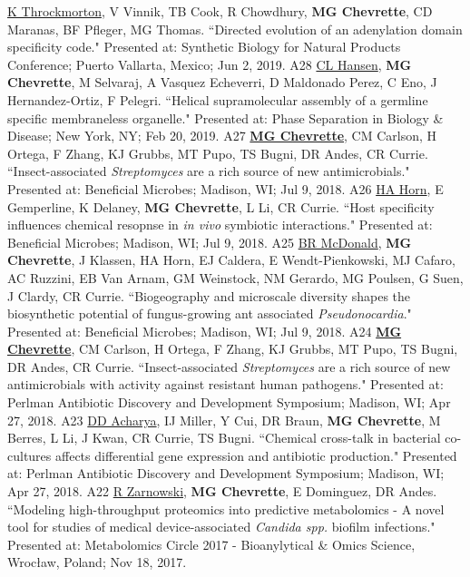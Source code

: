 \begin{cvpubs}
  \cvpub
    {\underline{K Throckmorton}, V Vinnik, TB Cook, R Chowdhury, \textbf{MG Chevrette}, CD Maranas, BF Pfleger, MG Thomas. ``Directed evolution of an adenylation domain specificity code." Presented at: Synthetic Biology for Natural Products Conference; Puerto Vallarta, Mexico; Jun 2, 2019.} %
    {A28} %
  \cvpub
    {\underline{CL Hansen}, \textbf{MG Chevrette}, M Selvaraj, A Vasquez Echeverri, D Maldonado Perez, C Eno, J Hernandez-Ortiz, F Pelegri. ``Helical supramolecular assembly of a germline specific membraneless organelle." Presented at: Phase Separation in Biology \& Disease; New York, NY; Feb 20, 2019.} %
    {A27} %
  \cvpub
    {\underline{\textbf{MG Chevrette}}, CM Carlson, H Ortega, F Zhang, KJ Grubbs, MT Pupo, TS Bugni, DR Andes, CR Currie. ``Insect-associated \textit{Streptomyces} are a rich source of new antimicrobials." Presented at: Beneficial Microbes; Madison, WI; Jul 9, 2018.} %
    {A26} %
  \cvpub
    {\underline{HA Horn}, E Gemperline, K Delaney, \textbf{MG Chevrette}, L Li, CR Currie. ``Host specificity influences chemical resopnse in \textit{in vivo} symbiotic interactions." Presented at: Beneficial Microbes; Madison, WI; Jul 9, 2018.} %
    {A25} %
  \cvpub
    {\underline{BR McDonald}, \textbf{MG Chevrette}, J Klassen, HA Horn, EJ Caldera, E Wendt-Pienkowski, MJ Cafaro, AC Ruzzini, EB Van Arnam, GM Weinstock, NM Gerardo, MG Poulsen, G Suen, J Clardy, CR Currie. ``Biogeography and microscale diversity shapes the biosynthetic potential of fungus-growing ant associated \textit{Pseudonocardia}." Presented at: Beneficial Microbes; Madison, WI; Jul 9, 2018.} %
    {A24} %
  \cvpub
    {\underline{\textbf{MG Chevrette}}, CM Carlson, H Ortega, F Zhang, KJ Grubbs, MT Pupo, TS Bugni, DR Andes, CR Currie. ``Insect-associated \textit{Streptomyces} are a rich source of new antimicrobials with activity against resistant human pathogens." Presented at: Perlman Antibiotic Discovery and Development Symposium; Madison, WI; Apr 27, 2018.} %
    {A23} %
  \cvpub
    {\underline{DD Acharya}, IJ Miller, Y Cui, DR Braun, \textbf{MG Chevrette}, M Berres, L Li, J Kwan, CR Currie, TS Bugni. ``Chemical cross-talk in bacterial co-cultures affects differential gene expression and antibiotic production." Presented at: Perlman Antibiotic Discovery and Development Symposium; Madison, WI; Apr 27, 2018.} %
    {A22} %
  \cvpub
    {\underline{R Zarnowski}, \textbf{MG Chevrette}, E Dominguez, DR Andes. ``Modeling high-throughput proteomics into predictive metabolomics - A novel tool for studies of medical device-associated \textit{Candida spp.} biofilm infections." Presented at: Metabolomics Circle 2017 - Bioanylytical \& Omics Science, Wrocław, Poland; Nov 18, 2017.} %

\end{cvpubs}
